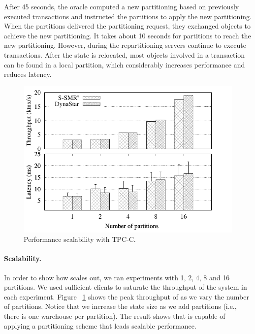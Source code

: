 
After 45 seconds, the oracle computed a new partitioning based on previously executed transactions and instructed the partitions to apply the new partitioning.
When the partitions delivered the partitioning request, they exchanged objects to achieve the new partitioning.
It takes about 10 seconds for partitions to reach the new partitioning.
However, during the repartitioning servers continue to execute transactions.
After the state is relocated, most objects involved in a transaction
can be found in a local partition, which considerably increases performance and reduces latency. 

\begin{figure}[ht!]
  \centering
    \includegraphics[width=\columnwidth]{figures/experiments/tpcc-scaling-tp-lat/tpcc-scaling-tp-lat}
  \caption{Performance scalability with TPC-C.}
  \label{fig:tpcc_scaling}
\end{figure}
\paragraph*{Scalability.}
In order to show how \dynastar scales out, we ran experiments with 1, 2, 4, 8 and 16 partitions. 
We used sufficient clients to  saturate the throughput of the system in each experiment. 
Figure ~\ref{fig:tpcc_scaling} shows the peak throughput of \dynastar as we vary the 
number of partitions. 
Notice that we increase the state size as we add partitions (i.e., there is one warehouse per partition).
The result shows that \dynastar is capable of applying
a partitioning scheme that leads scalable performance.


